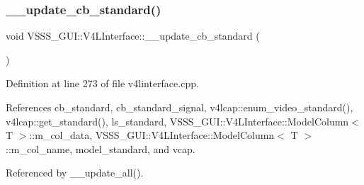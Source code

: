 \subsubsection{\texorpdfstring{\+\_\+\+\_\+update\+\_\+cb\+\_\+standard()}{\_\_update\_cb\_standard()}}
{\footnotesize\ttfamily void V\+S\+S\+S\+\_\+\+G\+U\+I\+::\+V4\+L\+Interface\+::\+\_\+\+\_\+update\+\_\+cb\+\_\+standard (\begin{DoxyParamCaption}{ }\end{DoxyParamCaption})\hspace{0.3cm}{\ttfamily [private]}}



Definition at line 273 of file v4linterface.\+cpp.



References cb\+\_\+standard, cb\+\_\+standard\+\_\+signal, v4lcap\+::enum\+\_\+video\+\_\+standard(), v4lcap\+::get\+\_\+standard(), ls\+\_\+standard, V\+S\+S\+S\+\_\+\+G\+U\+I\+::\+V4\+L\+Interface\+::\+Model\+Column$<$ T $>$\+::m\+\_\+col\+\_\+data, V\+S\+S\+S\+\_\+\+G\+U\+I\+::\+V4\+L\+Interface\+::\+Model\+Column$<$ T $>$\+::m\+\_\+col\+\_\+name, model\+\_\+standard, and vcap.



Referenced by \+\_\+\+\_\+update\+\_\+all().


